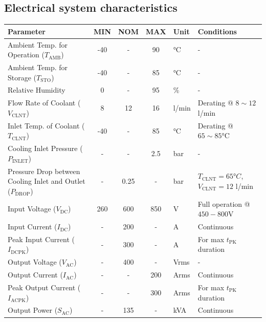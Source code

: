\subsection{Electrical system characteristics}   
\begin{table}[H]
    \centering
    \begin{adjustbox}{width=\textwidth,center}
    \begin{tabular}{|l|c|c|c|l|l|}
        \hline
        \textbf{Parameter} & \textbf{MIN} & \textbf{NOM} & \textbf{MAX} & \textbf{Unit} & \textbf{Conditions} \\
        \hline
        Ambient Temp. for Operation ($T_{\text{AMB}}$) & -40 & - & 90 & °C & - \\
        \hline
        Ambient Temp. for Storage ($T_{\text{STO}}$) & -40 & - & 85 & °C & - \\
        \hline
        Relative Humidity & 0 & - & 95 & \% & - \\
        \hline
        Flow Rate of Coolant ($V_{\text{CLNT}}$) & 8 & 12 & 16 & l/min & Derating @ $8\sim12$ l/min \\
        \hline
        Inlet Temp. of Coolant ($T_{\text{CLNT}}$) & -40 & - & 85 & °C & Derating @ $65\sim85$°C \\
        \hline
        Cooling Inlet Pressure ($P_{\text{INLET}}$) & - & - & 2.5 & bar & - \\
        \hline
        Pressure Drop between Cooling Inlet and Outlet ($P_{\text{DROP}}$) & - & 0.25 & - & bar & $T_{\text{CLNT}}=65°C$, $V_{\text{CLNT}}=12$ l/min \\
        \hline
        Input Voltage ($V_{\text{DC}}$) & 260 & 600 & 850 & V & Full operation @ $450-800$V \\
        \hline
        Input Current ($I_{\text{DC}}$) & - & 200 & - & A & Continuous \\
        \hline
        Peak Input Current ($I_{\text{DCPK}}$) & - & 300 & - & A & For max $t_{\text{PK}}$ duration \\
        \hline
        Output Voltage ($V_{\text{AC}}$) & - & 400 & - & Vrms & - \\
        \hline
        Output Current ($I_{\text{AC}}$) & - & - & 200 & Arms & Continuous \\
        \hline
        Peak Output Current ($I_{\text{ACPK}}$) & - & - & 300 & Arms & For max $t_{\text{PK}}$ duration \\
        \hline
        Output Power ($S_{\text{AC}}$) & - & 135 & - & kVA & Continuous \\

\end{tabular}
\end{adjustbox}
\end{table}
